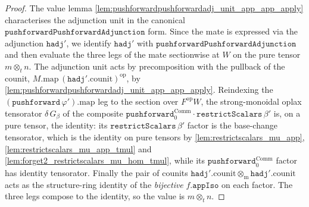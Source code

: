 \begin{proof}
  \leanok
  The value lemma \cref{lem:pushforwardpushforwardadj_unit_app_app_apply} characterises the
  adjunction unit in the canonical \(\mathtt{pushforwardPushforwardAdjunction}\) form. Since the
  mate is expressed via the adjunction \(\mathtt{hadj}'\), we identify \(\mathtt{hadj}'\) with
  \(\mathtt{pushforwardPushforwardAdjunction}\) and then evaluate the three legs of the mate
  sectionwise at \(W\) on the pure tensor
  \(m \otimes_t n\). The adjunction unit acts by precomposition with the pullback of the counit,
  \(M.\mathrm{map}\,(\mathtt{hadj}'.\mathrm{counit})^{\mathrm{op}}\), by
  \cref{lem:pushforwardpushforwardadj_unit_app_app_apply}. Reindexing the
  \((\mathtt{pushforward}\,\varphi').\mathrm{map}\) leg to the section over \(F^{\mathrm{op}}W\), the
  strong-monoidal oplax tensorator \(\delta\,G_\beta\) of the composite
  \(\mathtt{pushforward}_0^{\mathrm{Comm}} \cdot \mathtt{restrictScalars}\,\beta'\) is, on a pure
  tensor, the identity: its \(\mathtt{restrictScalars}\,\beta'\) factor is the base-change tensorator,
  which is the identity on pure tensors by \cref{lem:restrictscalars_mu_app},
  \cref{lem:restrictscalars_mu_app_tmul} and \cref{lem:forget2_restrictscalars_mu_hom_tmul}, while its
  \(\mathtt{pushforward}_0^{\mathrm{Comm}}\) factor has identity tensorator. Finally the pair of
  counits \(\mathtt{hadj}'.\mathrm{counit} \otimes_{\mathrm m} \mathtt{hadj}'.\mathrm{counit}\) acts as
  the structure-ring identity of the \emph{bijective} \(f.\mathtt{appIso}\) on each factor. The three
  legs compose to the identity, so the value is \(m \otimes_t n\).


\end{proof}
